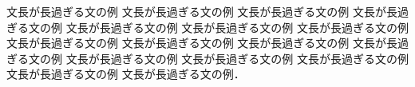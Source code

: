 文長が長過ぎる文の例
文長が長過ぎる文の例
文長が長過ぎる文の例
文長が長過ぎる文の例
文長が長過ぎる文の例
文長が長過ぎる文の例
文長が長過ぎる文の例
文長が長過ぎる文の例
文長が長過ぎる文の例
文長が長過ぎる文の例
文長が長過ぎる文の例
文長が長過ぎる文の例
文長が長過ぎる文の例
文長が長過ぎる文の例
文長が長過ぎる文の例
文長が長過ぎる文の例．
